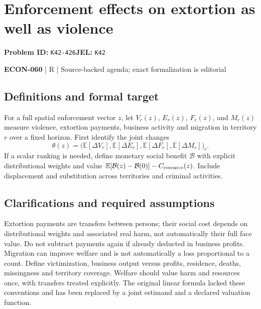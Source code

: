 \documentclass[11pt,a4paper]{article}
\begin{document}
\section*{Enforcement effects on extortion as well as violence}
\textbf{Problem ID:} \texttt{K42-426}\quad \textbf{JEL:} \texttt{K42}\par
\label{problem:OP-0629}


\label{audited:ECON-060}

{\sffamily\small\color{muted}\textbf{ECON-060} | R | Source-backed agenda; exact formalization is editorial\par}

\subsection*{Definitions and formal target}

For a full spatial enforcement vector \(z\), let \(V_r(z)\), \(E_r(z)\), \(F_r(z)\), and \(M_r(z)\) measure violence, extortion payments, business activity and migration in territory \(r\) over a fixed horizon. First identify the joint changes
\[
 \theta(z)=\bigl(\mathbb E[\Delta V_r],\mathbb E[\Delta E_r],
                 \mathbb E[\Delta F_r],\mathbb E[\Delta M_r]\bigr)_r .
\]
If a scalar ranking is needed, define monetary social benefit \(\mathcal B\) with explicit distributional weights and value \(\mathbb E[\mathcal B(z)-\mathcal B(0)]-C_{\rm resource}(z)\). Include displacement and substitution across territories and criminal activities.

\subsection*{Clarifications and required assumptions}

Extortion payments are transfers between persons; their social cost depends on distributional weights and associated real harm, not automatically their full face value. Do not subtract payments again if already deducted in business profits. Migration can improve welfare and is not automatically a loss proportional to a count. Define victimization, business output versus profits, residence, deaths, missingness and territory coverage. Welfare should value harm and resources once, with transfers treated explicitly. The original linear formula lacked these conventions and has been replaced by a joint estimand and a declared valuation function.
\end{document}
